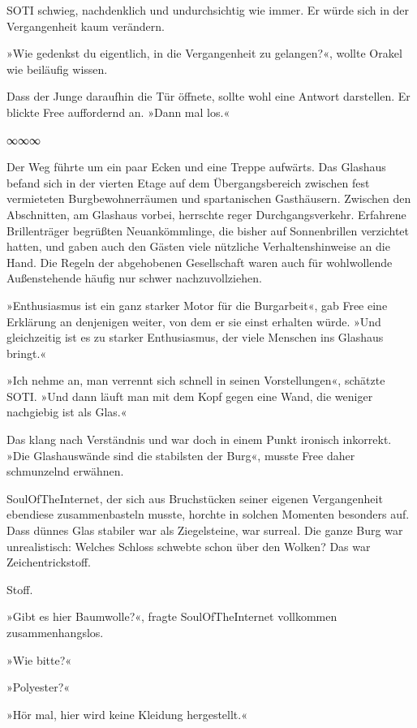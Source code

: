 SOTI schwieg, nachdenklich und undurchsichtig wie immer. Er würde sich in der Vergangenheit kaum verändern.

»Wie gedenkst du eigentlich, in die Vergangenheit zu gelangen?«, wollte Orakel wie beiläufig wissen.

Dass der Junge daraufhin die Tür öffnete, sollte wohl eine Antwort darstellen. Er blickte Free auffordernd an. »Dann mal los.«

\begin{center}
∞∞∞
\end{center}

Der Weg führte um ein paar Ecken und eine Treppe aufwärts. Das Glashaus befand sich in der vierten Etage auf dem Übergangsbereich zwischen fest vermieteten Burgbewohnerräumen und spartanischen Gasthäusern. Zwischen den Abschnitten, am Glashaus vorbei, herrschte reger Durchgangsverkehr. Erfahrene Brillenträger begrüßten Neuankömmlinge, die bisher auf Sonnenbrillen verzichtet hatten, und gaben auch den Gästen viele nützliche Verhaltenshinweise an die Hand. Die Regeln der abgehobenen Gesellschaft waren auch für wohlwollende Außenstehende häufig nur schwer nachzuvollziehen.

»Enthusiasmus ist ein ganz starker Motor für die Burgarbeit«, gab Free eine Erklärung an denjenigen weiter, von dem er sie einst erhalten würde. »Und gleichzeitig ist es zu starker Enthusiasmus, der viele Menschen ins Glashaus bringt.«

»Ich nehme an, man verrennt sich schnell in seinen Vorstellungen«, schätzte SOTI. »Und dann läuft man mit dem Kopf gegen eine Wand, die weniger nachgiebig ist als Glas.«

Das klang nach Verständnis und war doch in einem Punkt ironisch inkorrekt. »Die Glashauswände sind die stabilsten der Burg«, musste Free daher schmunzelnd erwähnen.

SoulOfTheInternet, der sich aus Bruchstücken seiner eigenen Vergangenheit ebendiese zusammenbasteln musste, horchte in solchen Momenten besonders auf. Dass dünnes Glas stabiler war als Ziegelsteine, war surreal. Die ganze Burg war unrealistisch: Welches Schloss schwebte schon über den Wolken? Das war Zeichentrickstoff.

Stoff.

»Gibt es hier Baumwolle?«, fragte SoulOfTheInternet vollkommen zusammenhangslos.

»Wie bitte?«

»Polyester?«

»Hör mal, hier wird keine Kleidung hergestellt.«

